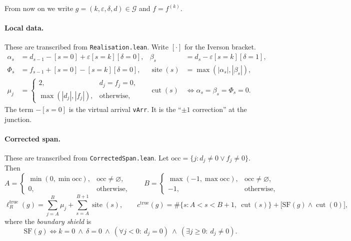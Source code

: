 \documentclass[11pt]{article}
\theoremstyle{plain}
\theoremstyle{definition}
\theoremstyle{remark}
\begin{document}
From now on we write $g=(k,\varepsilon,\delta,d)\in\mathcal G$ and $f=f^{(k)}$.

\paragraph{Local data.}
These are transcribed from \texttt{Realisation.lean}. Write $[\cdot]$ for the Iverson bracket.
\begin{align*}
  \alpha_s&=d_{s-1}-[s=0]+\varepsilon[s=k][\delta=0],&
  \beta_s&=d_s-\varepsilon[s=k][\delta=1],\\
  \Phi_s&=f_{s-1}+[s=0]-[s=k][\delta=0],&
  \operatorname{site}(s)&=\max(|\alpha_s|,|\beta_s|),\\
  \mu_j&=\begin{cases}2,&d_j=f_j=0,\\ \max(|d_j|,|f_j|),&\text{otherwise,}\end{cases}&
  \operatorname{cut}(s)&\iff\alpha_s=\beta_s=\Phi_s=0 .
\end{align*}
The term $-[s=0]$ is the virtual arrival \texttt{vArr}. It is the ``$\pm1$ correction'' at
the junction.

\paragraph{Corrected span.}
These are transcribed from \texttt{CorrectedSpan.lean}. Let
$\mathrm{occ}=\{j:d_j\ne0\vee f_j\ne0\}$. Then
\[
  A=\begin{cases}\min(0,\min\mathrm{occ}),&\mathrm{occ}\neq\varnothing,\\ 0,&\text{otherwise,}\end{cases}
  \qquad
  B=\begin{cases}\max(-1,\max\mathrm{occ}),&\mathrm{occ}\neq\varnothing,\\ -1,&\text{otherwise,}\end{cases}
\]
\[
  \ell_R^{\mathrm{true}}(g)=\sum_{j=A}^{B}\mu_j+\sum_{s=A}^{B+1}\operatorname{site}(s),\qquad
  c^{\mathrm{true}}(g)=\#\{s:A<s<B+1,\ \operatorname{cut}(s)\}
     +\bigl[\mathrm{SF}(g)\wedge\operatorname{cut}(0)\bigr],
\]
where the \emph{boundary shield} is
\[
  \mathrm{SF}(g)\iff k=0\ \wedge\ \delta=0\ \wedge\ (\forall j<0:\ d_j=0)\ \wedge\ (\exists j\ge0:\ d_j\ne0).
\]
\end{document}
